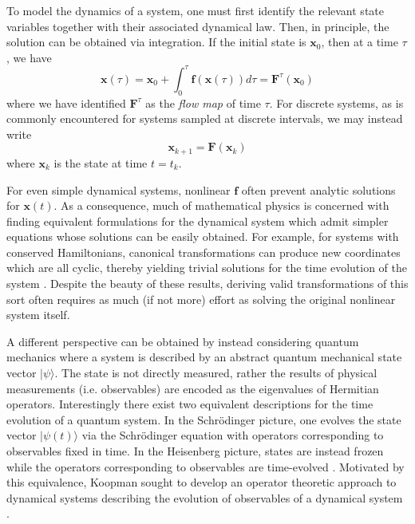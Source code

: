 To model the dynamics of a system, one must first identify the relevant state
variables together with their associated dynamical law. Then, in principle, the
solution can be obtained via integration. If the initial state is
$\mathbf{x}_0$, then at a time $\tau$, we have
\begin{equation}
  \mathbf{x}(\tau) = \mathbf{x}_0 + \int_0^{\tau} \mathbf{f}(\mathbf{x}(\tau)) d\tau = \mathbf{F}^{\tau}(\mathbf{x}_0)
\end{equation}
where we have identified $\mathbf{F}^\tau$ as the \textit{flow map} of time
$\tau$. For discrete systems, as is commonly encountered for systems sampled at
discrete intervals, we may instead write
\begin{equation}
  \mathbf{x}_{k+1} = \mathbf{F}(\mathbf{x}_k)
\end{equation}
where $\mathbf{x}_k$ is the state at time $t=t_k$.

For even simple dynamical systems, nonlinear $\mathbf{f}$ often prevent analytic
solutions for $\mathbf{x}(t)$. As a consequence, much of mathematical physics is
concerned with finding equivalent formulations for the dynamical system which
admit simpler equations whose solutions can be easily obtained. For example, for
systems with conserved Hamiltonians, canonical transformations can produce new
coordinates which are all cyclic, thereby yielding trivial solutions for the
time evolution of the system \cite{goldstein}. Despite the beauty of these
results, deriving valid transformations of this sort often requires as much (if
not more) effort as solving the original nonlinear system itself.

A different perspective can be obtained by instead considering quantum
mechanics where a system is described by an abstract quantum
mechanical state vector $\lvert \psi \rangle$. The state is not directly
measured, rather the results of physical measurements (i.e. observables) are
encoded as the
eigenvalues of Hermitian operators. Interestingly there exist two equivalent
descriptions for the time evolution of a quantum system. In the Schr\"{o}dinger
picture, one evolves the state vector $\lvert  \psi(t) \rangle$ via the
Schr\"{o}dinger equation with operators corresponding to observables fixed
in time. In the Heisenberg picture, states are instead frozen while the operators
corresponding to observables are time-evolved \cite[pgs 80-84]{sakurai}.
Motivated by this equivalence, Koopman sought to develop an operator theoretic
approach to dynamical systems describing the evolution of observables of a
dynamical system \cite{koopman-orig}.

